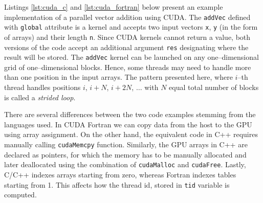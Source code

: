 \begin{example}
Listings \ref{lst:cuda_c} and \ref{lst:cuda_fortran} below present an example implementation of a
parallel vector addition using CUDA. The \texttt{addVec} defined with \texttt{global} attribute is a
kernel and accepts two input vectors \texttt{x}, \texttt{y} (in the form of arrays) and their length
\texttt{n}. Since CUDA kernels cannot return a value, both versions of the code accept an additional
argument \texttt{res} designating where the result will be stored. The \texttt{addVec} kernel can be
launched on any one--dimensional grid of one--dimensional blocks. Hence, some threads may need to
handle more than one position in the input arrays. The pattern presented here, where $i$--th thread
handles positions $i$, $i+N$, $i+2N$, $\ldots$ with $N$ equal total number of blocks is called a
\emph{strided loop}.

There are several differences between the two code examples stemming from the languages used. In
CUDA Fortran we can copy data from the host to the GPU using array assignment. On
the other hand, the equivalent code in C++ requires manually calling \texttt{cudaMemcpy} function.
Similarly, the GPU arrays in C++ are declared as pointers, for which the memory has to be manually
allocated and later deallocated using the combination of \texttt{cudaMalloc} and \texttt{cudaFree}.
Lastly, C/C++ indexes arrays starting from zero, whereas Fortran indexes tables starting from 1.
This affects how the thread id, stored in \texttt{tid} variable is computed.






\end{example}

